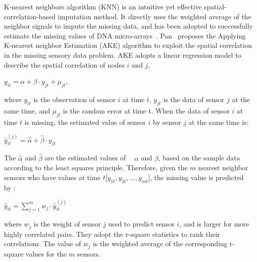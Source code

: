 K-nearest neighbors algorithm (KNN) is an intuitive yet effective spatial-correlation-based imputation method. 
It directly uses the weighted average of the neighbor signals to impute the missing data, and has been adopted to successfully 
estimate the missing values of DNA micro-arrays~\cite{Troyanskaya:DNAKNN}.  
Pan~\cite{pan2010k} proposes the Applying K-nearest neighbor Estimation (AKE) algorithm to exploit the spatial correlation in the 
missing sensory data problem. 
AKE adopts a linear regression model to describe the spatial correlation of nodes $i$ and $j$,
\begin{center}
$y_{it} = \alpha + \beta\cdot y_{jt} + \mu_{jt} $,
\end{center}
where $y_{it}$ is the observation of sensor $i$ at time $t$, $y_{jt}$ is the data of sensor $j$ at the same time, 
and $\mu_{jt}$ is the random error at time t.   
When the data of sensor $i$ at time $t$ is missing, the estimated value of sensor $i$ by sensor $j$ at the same time is:
\begin{center}
$\hat{y}_{it}^{(j)} =\hat{\alpha} +\hat{\beta}\cdot y_{jt}$
\end{center}
The $\hat{\alpha}$ and $\hat{\beta}$ are the estimated values of  $\alpha$ and $\beta$, based on the sample data according to the least squares principle.
Therefore, given the $m$ nearest neighbor sensors who have values at time $t$[$y_{1t}, y_{2t},\dots, y_{mt}$], the missing value is predicted by :   
 \begin{center}
$ \hat{y}_{it} =\sum_{j=1}^m w_j \cdot \hat{y}_{it}^{(j)}$
 \end{center}
%
where $w_j$ is the weight of sensor $j$ used to predict sensor $i$, and is larger for more highly correlated pairs.
They adopt the r-square statistics to rank their correlations. The value of $w_j$ is the weighted average of the corresponding 
r-square values for the $m$ sensors. 

